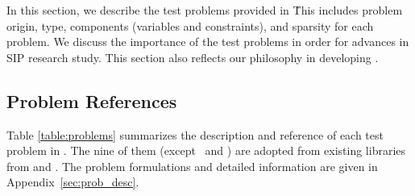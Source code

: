 In this section, we describe the test problems provided in \siplibtwo\. This includes problem origin, type, components (variables and constraints), and sparsity for each problem. We discuss the importance of the test problems in order for advances in SIP research study. This section also reflects our philosophy in developing \siplibtwo. 

\subsection{Problem References}
Table \ref{table:problems} summarizes the description and reference of each test problem in \siplibtwo. The nine of them (except \sdcp\ and \suc) are adopted from existing libraries from \cite{web:SIPLIB1} and \cite{journal:AF2004}. The problem formulations and detailed information are given in Appendix~\ref{sec:prob_desc}.



